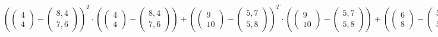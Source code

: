 \documentclass[a4paper,parskip=full-]{article}
\begin{document}
$$\left( \begin{pmatrix} 4 \\ 4 \end{pmatrix} - \begin{pmatrix} 8,4 \\ 7,6 \end{pmatrix} \right)^T \cdot
\left( \begin{pmatrix} 4 \\ 4 \end{pmatrix} - \begin{pmatrix} 8,4 \\ 7,6 \end{pmatrix} \right) + 
\left( \begin{pmatrix}  9 \\ 10 \end{pmatrix} - \begin{pmatrix} 5,7 \\ 5,8 \end{pmatrix} \right)^T \cdot
\left( \begin{pmatrix}  9 \\ 10 \end{pmatrix} - \begin{pmatrix} 5,7 \\ 5,8 \end{pmatrix} \right) +
\left( \begin{pmatrix}  6 \\  8 \end{pmatrix} - \begin{pmatrix} 5,7 \\ 5,8 \end{pmatrix} \right)^T \cdot
\left( \begin{pmatrix}  6 \\  8 \end{pmatrix} - \begin{pmatrix} 5,7 \\ 5,8 \end{pmatrix} \right) +
\left( \begin{pmatrix}  9 \\  5 \end{pmatrix} - \begin{pmatrix} 5,7 \\ 5,8 \end{pmatrix} \right)^T \cdot
\left( \begin{pmatrix}  9 \\  5 \end{pmatrix} - \begin{pmatrix} 5,7 \\ 5,8 \end{pmatrix} \right) +
$$
\end{document}
